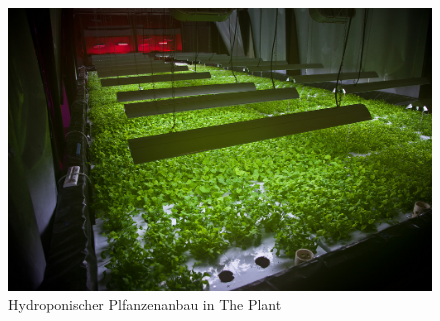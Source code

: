 \documentclass{scrartcl}
\begin{document}
\begin{figure}[htbp]
    \centering
    \includegraphics[width=14cm]{image_folder/the_plant_2.jpg}
    \caption{Hydroponischer Plfanzenanbau in The Plant}
\end{figure} 
\end{document}
